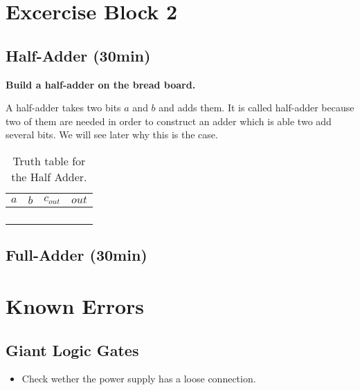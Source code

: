\documentclass[10pt,a4paper]{article}
\begin{document}
\section{Excercise Block 2}

\subsection{Half-Adder (30min)}
\textbf{Build a half-adder on the bread board.}

A half-adder takes two bits $a$ and $b$ and adds them. It is called half-adder because two of them are needed in order to construct an adder which is able two add several bits. We will see later why this is the case.
\begin{table}[H]
	\centering
	\begin{tabular}{|c|c||c|c|}
		\hline
		$a$ & $b$ & $c_{out}$ & $out$ \\ \hline
		&     &           &       \\ \hline
		&     &           &       \\ \hline
		&     &           &       \\ \hline
		&     &           &       \\ \hline
	\end{tabular}
	\caption{Truth table for the Half Adder.}
	\label{tab:half-adder-truth-table}
\end{table}

\subsection{Full-Adder (30min)}

\section{Known Errors}
\subsection{Giant Logic Gates}
\begin{itemize}
	\item Check wether the power supply has a loose connection.
\end{itemize}
\end{document}
